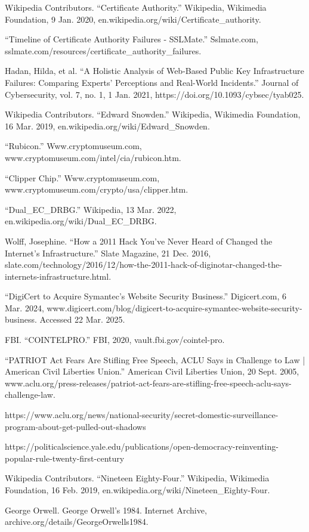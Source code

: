 \documentclass[twoside,twocolumn]{article}
\begin{document}
\begin{thebibliography}{99}
  
  Wikipedia Contributors. “Certificate Authority.” Wikipedia, Wikimedia Foundation, 9 Jan. 2020, en.wikipedia.org/wiki/Certificate\_authority.


“Timeline of Certificate Authority Failures - SSLMate.” Sslmate.com, sslmate.com/resources/certificate\_authority\_failures.

  Hadan, Hilda, et al. “A Holistic Analysis of Web-Based Public Key Infrastructure Failures: Comparing Experts’ Perceptions and Real-World Incidents.” Journal of Cybersecurity, vol. 7, no. 1, 1 Jan. 2021, https://doi.org/10.1093/cybsec/tyab025.
  
  Wikipedia Contributors. “Edward Snowden.” Wikipedia, Wikimedia Foundation, 16 Mar. 2019, en.wikipedia.org/wiki/Edward\_Snowden.

  “Rubicon.” Www.cryptomuseum.com, www.cryptomuseum.com/intel/cia/rubicon.htm.

  “Clipper Chip.” Www.cryptomuseum.com, www.cryptomuseum.com/crypto/usa/clipper.htm.


  “Dual\_EC\_DRBG.” Wikipedia, 13 Mar. 2022, en.wikipedia.org/wiki/Dual\_EC\_DRBG.

  Wolff, Josephine. “How a 2011 Hack You’ve Never Heard of Changed the Internet’s Infrastructure.” Slate Magazine, 21 Dec. 2016, slate.com/technology/2016/12/how-the-2011-hack-of-diginotar-changed-the-internets-infrastructure.html.


  “DigiCert to Acquire Symantec’s Website Security Business.” Digicert.com, 6 Mar. 2024, www.digicert.com/blog/digicert-to-acquire-symantec-website-security-business. Accessed 22 Mar. 2025.



  FBI. “COINTELPRO.” FBI, 2020, vault.fbi.gov/cointel-pro.



  “PATRIOT Act Fears Are Stifling Free Speech, ACLU Says in Challenge to Law | American Civil Liberties Union.” American Civil Liberties Union, 20 Sept. 2005, www.aclu.org/press-releases/patriot-act-fears-are-stifling-free-speech-aclu-says-challenge-law.

  https://www.aclu.org/news/national-security/secret-domestic-surveillance-program-about-get-pulled-out-shadows
  
  https://politicalscience.yale.edu/publications/open-democracy-reinventing-popular-rule-twenty-first-century


  Wikipedia Contributors. “Nineteen Eighty-Four.” Wikipedia, Wikimedia Foundation, 16 Feb. 2019, en.wikipedia.org/wiki/Nineteen\_Eighty-Four.

  George Orwell. George Orwell’s 1984. Internet Archive, archive.org/details/GeorgeOrwells1984.

  
\end{thebibliography}

\end{document}
